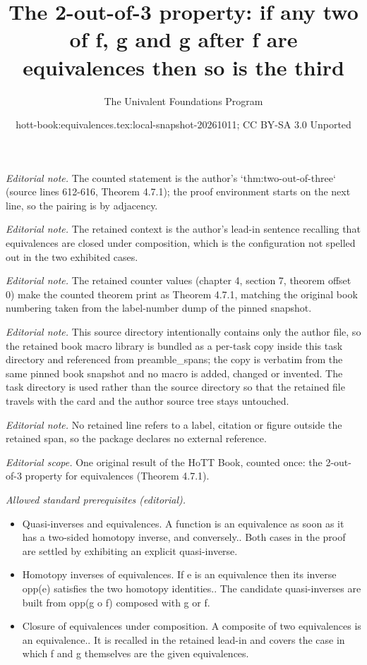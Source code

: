 \documentclass[10pt,a4paper]{article}
\title{The 2-out-of-3 property: if any two of f, g and g after f are equivalences then so is the third}
\author{The Univalent Foundations Program}
\date{hott-book:equivalences.tex:local-snapshot-20261011; CC BY-SA 3.0 Unported}
\newcounter{chapter}
\theoremstyle{definition}
\theoremstyle{remark}
\numberwithin{equation}{section}
\begin{document}
\maketitle
\setcounter{chapter}{4}
\setcounter{section}{7}
\setcounter{thm}{0}
\noindent\textit{Editorial note.} The counted statement is the author's `thm:two-out-of-three` (source lines 612-616, Theorem 4.7.1); the proof environment starts on the next line, so the pairing is by adjacency.\par\medskip
\noindent\textit{Editorial note.} The retained context is the author's lead-in sentence recalling that equivalences are closed under composition, which is the configuration not spelled out in the two exhibited cases.\par\medskip
\noindent\textit{Editorial note.} The retained counter values (chapter 4, section 7, theorem offset 0) make the counted theorem print as Theorem 4.7.1, matching the original book numbering taken from the label-number dump of the pinned snapshot.\par\medskip
\noindent\textit{Editorial note.} This source directory intentionally contains only the author file, so the retained book macro library is bundled as a per-task copy inside this task directory and referenced from preamble\_spans; the copy is verbatim from the same pinned book snapshot and no macro is added, changed or invented. The task directory is used rather than the source directory so that the retained file travels with the card and the author source tree stays untouched.\par\medskip
\noindent\textit{Editorial note.} No retained line refers to a label, citation or figure outside the retained span, so the package declares no external reference.\par\medskip
\noindent\textit{Editorial scope.} One original result of the HoTT Book, counted once: the 2-out-of-3 property for equivalences (Theorem 4.7.1).\par\medskip
\noindent\textit{Allowed standard prerequisites (editorial).}\begin{itemize}
\item Quasi-inverses and equivalences. A function is an equivalence as soon as it has a two-sided homotopy inverse, and conversely.. Both cases in the proof are settled by exhibiting an explicit quasi-inverse.
\item Homotopy inverses of equivalences. If e is an equivalence then its inverse opp(e) satisfies the two homotopy identities.. The candidate quasi-inverses are built from opp(g o f) composed with g or f.
\item Closure of equivalences under composition. A composite of two equivalences is an equivalence.. It is recalled in the retained lead-in and covers the case in which f and g themselves are the given equivalences.
\end{itemize}\medskip
\end{document}
